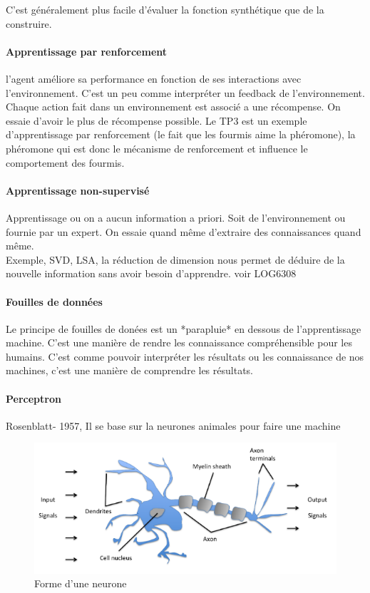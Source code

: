 \documentclass[oneside]{book}
\begin{document}
C'est généralement plus facile d'évaluer la fonction synthétique que de la construire. \\

\paragraph{Apprentissage par renforcement}
l'agent améliore sa performance en fonction de ses interactions avec l'environnement. C'est un peu comme interpréter un feedback de l'environnement. Chaque action fait dans un environnement est associé a une récompense. On essaie d'avoir le plus de récompense possible. Le TP3 est un exemple d'apprentissage par renforcement (le fait que les fourmis aime la phéromone), la phéromone qui est donc le mécanisme de renforcement et influence le comportement des fourmis.\\

\paragraph{Apprentissage non-supervisé}
Apprentissage ou on a aucun information a priori. Soit de l'environnement ou fournie par un expert. On essaie quand même d'extraire des connaissances quand même.\\

Exemple, SVD, LSA, la réduction de dimension nous permet de déduire de la nouvelle information sans avoir besoin d'apprendre. voir LOG6308\\

\paragraph{Fouilles de données}
Le principe de fouilles de donées est un *parapluie* en dessous de l'apprentissage machine. C'est une manière de rendre les connaissance compréhensible pour les humains. C'est comme pouvoir interpréter les résultats ou les connaissance de nos machines, c'est une manière de comprendre les résultats.
\paragraph{Perceptron}
Rosenblatt- 1957, Il se base sur la neurones animales pour faire une machine\\
\begin{figure}[!ht]
\centering
\includegraphics[width= \linewidth]{Neurone.png}
\caption{Forme d'une neurone}
\label{fig:Neurone}
\end{figure}
\end{document}
